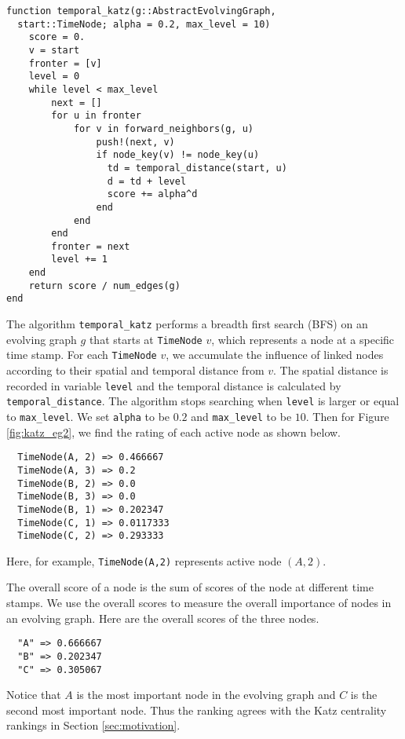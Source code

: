 \documentclass[12pt]{article}
\theoremstyle{definition}
\begin{document}
\begin{lstlisting}[caption={Temporal Katz Centrality of Single Node},label={lst:katz}, captionpos=b]
function temporal_katz(g::AbstractEvolvingGraph,
  start::TimeNode; alpha = 0.2, max_level = 10)
    score = 0.
    v = start
    fronter = [v]
    level = 0
    while level < max_level
        next = []
        for u in fronter
            for v in forward_neighbors(g, u)
                push!(next, v)
                if node_key(v) != node_key(u)
                  td = temporal_distance(start, u)
                  d = td + level
                  score += alpha^d
                end
            end
        end
        fronter = next
        level += 1
    end
    return score / num_edges(g)
end
\end{lstlisting}

The algorithm \texttt{temporal\_katz} performs a breadth first search (BFS) on an evolving graph $g$ that
starts at \texttt{TimeNode} $v$, which represents a node at a specific time stamp.
For each \texttt{TimeNode} $v$, we accumulate the influence of linked nodes according to their spatial and temporal
distance from $v$. The spatial distance is recorded in variable \texttt{level} and the temporal distance is calculated by
\texttt{temporal\_distance}. The algorithm stops searching when \texttt{level} is larger or equal to \texttt{max\_level}.
We set \texttt{alpha} to be $0.2$ and \texttt{max\_level} to be $10$. Then
for Figure \ref{fig:katz_eg2}, we find the rating of each active node as shown below.
\begin{lstlisting}
  TimeNode(A, 2) => 0.466667
  TimeNode(A, 3) => 0.2
  TimeNode(B, 2) => 0.0
  TimeNode(B, 3) => 0.0
  TimeNode(B, 1) => 0.202347
  TimeNode(C, 1) => 0.0117333
  TimeNode(C, 2) => 0.293333
\end{lstlisting}
Here, for example, \texttt{TimeNode(A,2)} represents active node $(A,2)$.

The overall score of a node is the sum of scores of the node at different time stamps. We use the overall scores to measure the overall importance of nodes in an evolving graph.
Here are the overall scores of the three nodes.
\begin{lstlisting}
  "A" => 0.666667
  "B" => 0.202347
  "C" => 0.305067
\end{lstlisting}
Notice that $A$ is the most important node in the evolving graph and $C$ is the second most important node.
Thus the ranking agrees with the Katz centrality rankings in Section \ref{sec:motivation}.
\end{document}
